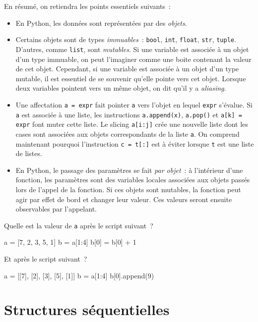 \documentclass{magnolia}
\begin{document}
En résumé, on retiendra les points essentiels suivants~:
\begin{itemize}
\item En Python, les données sont représentées par des \emph{objets}.
\item Certains objets sont de types \emph{immuables}~: \verb_bool_, \verb_int_, \verb_float_, \verb_str_, \verb_tuple_.
  D'autres, comme \verb!list!, sont \emph{mutables}. Si une variable est associée à un objet d'un
  type immuable, on peut l'imaginer comme une boite contenant la valeur de cet objet.
  Cependant, si une variable est associée à un objet d'un type mutable, il est essentiel de se souvenir
  qu'elle pointe vers cet objet.
  Lorsque deux variables pointent vers un même objet, on dit qu'il y a \emph{aliasing}.
\item Une affectation \verb!a = expr! fait pointer \verb!a! vers l'objet en lequel \verb!expr! s'évalue.
  Si \verb!a! est associée à une liste, les instructions \verb!a.append(x)!, \verb!a.pop()! et
  \verb!a[k] = expr! font muter cette liste. Le slicing \verb!a[i:j]! crée une nouvelle liste
  dont les cases sont associées aux objets correspondants de la liste \verb!a!. On comprend maintenant pourquoi l'instruction \verb!c = t[:]! est
  à éviter lorsque \verb!t! est une liste de listes.
\item En Python, le passage des paramètres se fait \emph{par objet}~: à l'intérieur d'une fonction, les
  paramètres sont des variables locales associées aux objets passés lors de l'appel
  de la fonction. Si ces objets sont mutables, la fonction peut agir par effet de bord et changer
  leur valeur. Ces valeurs seront ensuite observables par l'appelant.
\end{itemize}

\vspace{2ex}
\begin{exoUnique}
\exo
\begin{questions}
\question Quelle est la valeur de \verb!a! après le script suivant~?
\begin{pythoncode}
a = [7, 2, 3, 5, 1]
b = a[1:4]
b[0] = b[0] + 1
\end{pythoncode}
\question Et après le script suivant~?
\begin{pythoncode}
a = [[7], [2], [3], [5], [1]]
b = a[1:4]
b[0].append(9)
\end{pythoncode}
\end{questions}
\end{exoUnique}


\section{Structures séquentielles}
\end{document}
